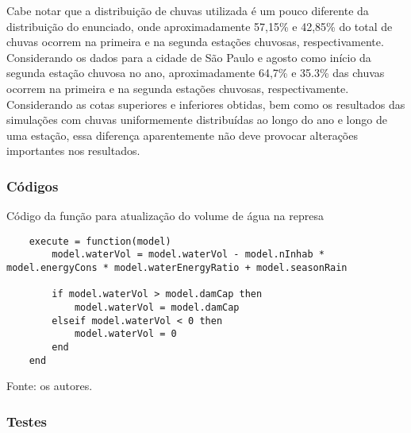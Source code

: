 \documentclass{article}
\begin{document}

Cabe notar que a distribuição de chuvas utilizada é um pouco diferente da distribuição do enunciado, onde aproximadamente 57,15\% e 42,85\% do total de chuvas ocorrem na primeira e na segunda estações chuvosas, respectivamente. Considerando os dados para a cidade de São Paulo e agosto como início da segunda estação chuvosa no ano, aproximadamente 64,7\% e 35.3\% das chuvas ocorrem na primeira e na segunda estações chuvosas, respectivamente. Considerando as cotas superiores e inferiores obtidas, bem como os resultados das simulações com chuvas uniformemente distribuídas ao longo do ano e longo de uma estação, essa diferença aparentemente não deve provocar alterações importantes nos resultados.

\subsubsection*{Códigos}

\begin{quadro}
\caption{Código da função para atualização do volume de água na represa}
\begin{threeparttable}[t]
    \begin{lstlisting}
    execute = function(model)
        model.waterVol = model.waterVol - model.nInhab * model.energyCons * model.waterEnergyRatio + model.seasonRain

        if model.waterVol > model.damCap then
            model.waterVol = model.damCap
        elseif model.waterVol < 0 then
            model.waterVol = 0
        end
    end
    \end{lstlisting}
    \begin{tablenotes}[flushleft]
        \item[] Fonte: os autores.
    \end{tablenotes}
\end{threeparttable}
\end{quadro}

\subsubsection*{Testes}
\end{document}
